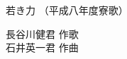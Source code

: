 \documentclass[10pt,b5j]{tarticle} %
\begin{document}
\begin{minipage}[c]{0.7\hsize} %
    \begin{center}
        {\LARGE
            若き力 %
        }
        {\small 
            （平成八年度寮歌） %
        }
    \end{center}
\end{minipage}
\begin{minipage}[c]{0.3\hsize} %
    \begin{flushright} %
        長谷川健君 作歌\\石井英一君 作曲 %
    \end{flushright}
\end{minipage}
\end{document}
